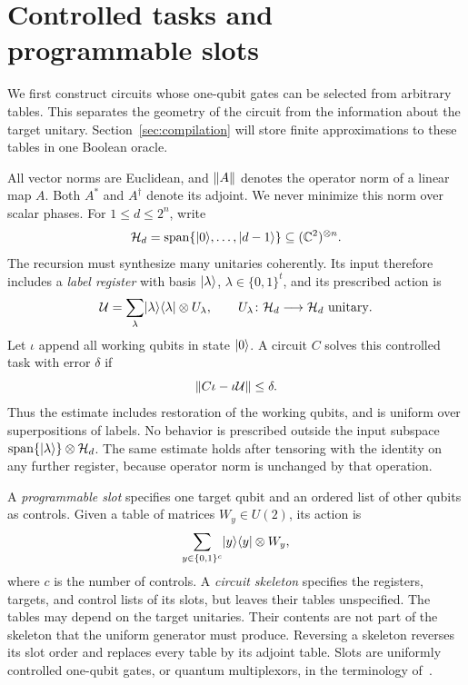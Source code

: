 \section{Controlled tasks and programmable slots}\label{sec:slots}

We first construct circuits whose one-qubit gates can be selected from arbitrary
tables. This separates the geometry of the circuit from the information about
the target unitary. Section~\ref{sec:compilation} will store finite approximations
to these tables in one Boolean oracle.

All vector norms are Euclidean, and $\lVert A\rVert$ denotes the operator norm of a
linear map $A$. Both $A^*$ and $A^\dagger$ denote its adjoint. We never minimize
this norm over scalar phases. For
$1\le d\le 2^n$, write
\[
 \mathcal H_d=\operatorname{span}\{\lvert 0\rangle,\ldots,\lvert d-1\rangle\}
 \subseteq (\mathbb C^2)^{\otimes n}.
\]
The recursion must synthesize many unitaries coherently. Its input therefore
includes a \emph{label register} with basis $\lvert \lambda\rangle$,
$\lambda\in\{0,1\}^t$, and its prescribed action is
\[
 \mathcal U=\sum_{\lambda}\lvert \lambda\rangle\langle \lambda\rvert\otimes U_\lambda,
 \qquad U_\lambda\colon\mathcal H_d\longrightarrow\mathcal H_d
 \text{ unitary}.
\]
Let $\iota$ append all working qubits in state $\lvert 0\rangle$. A circuit $C$
solves this controlled task with error $\delta$ if
\begin{equation}\label{slot:clean-error}
 \lVert C\iota-\iota\mathcal U\rVert\le\delta.
\end{equation}
Thus the estimate includes restoration of the working qubits, and is uniform
over superpositions of labels. No behavior is prescribed outside the input
subspace $\operatorname{span}\{\lvert \lambda\rangle\}\otimes\mathcal H_d$.
The same estimate holds after tensoring with the identity on any further
register, because operator norm is unchanged by that operation.

A \emph{programmable slot} specifies one target qubit and an ordered list of
other qubits as controls. Given a table of matrices $W_y\in U(2)$, its action is
\begin{equation}\label{slot:definition}
 \sum_{y\in\{0,1\}^c}\lvert y\rangle\langle y\rvert\otimes W_y,
\end{equation}
where $c$ is the number of controls. A \emph{circuit skeleton} specifies the
registers, targets, and control lists of its slots, but leaves their tables
unspecified. The tables may depend on the target unitaries. Their contents
are not part of the skeleton that the uniform generator must produce.
Reversing a skeleton reverses its slot order and replaces every table by its
adjoint table.
Slots are uniformly controlled one-qubit gates, or quantum multiplexors,
in the terminology of~\cite{BVMS2005}.

